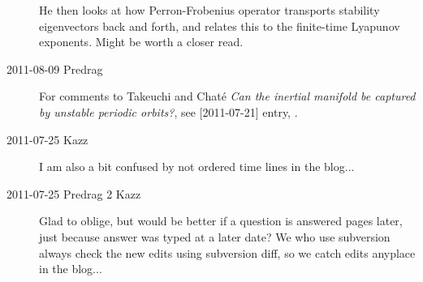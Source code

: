 \begin{description}
He then looks at how Perron-Frobenius operator transports
stability eigenvectors back and forth, and relates this to
the finite-time Lyapunov exponents. Might be worth a closer read.

\item[2011-08-09 Predrag] For comments to Takeuchi and Chat\'e
\emph{Can the inertial manifold be captured by unstable periodic
orbits?}, see [2011-07-21] entry, .

\item[2011-07-25 Kazz]
I am also a bit confused by not ordered time lines in the blog...

\item[2011-07-25 Predrag 2 Kazz]
Glad to oblige, but would be better if a question is answered pages
later, just because answer was typed at a later date? We who use subversion
always check the new edits using subversion diff, so we catch
edits anyplace in the blog...


\end{description}

\renewcommand{\ssp}{a}
